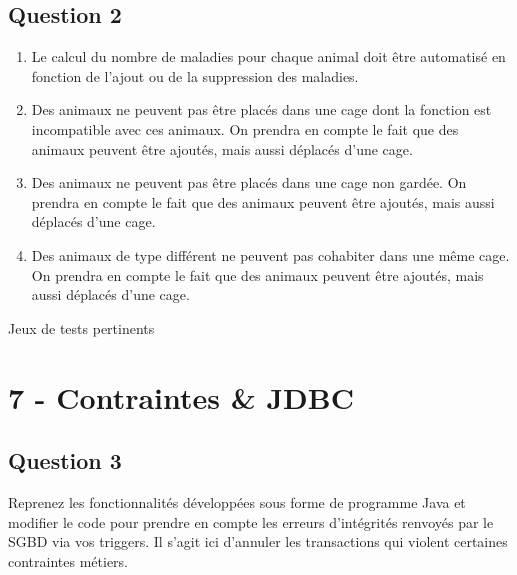 \documentclass{article}
\begin{document}
\subsection*{Question 2}
\begin{enumerate}[label=\arabic*)]
	\item Le calcul du nombre de maladies pour chaque animal doit être automatisé en fonction de l’ajout
ou de la suppression des maladies.
	\item Des animaux ne peuvent pas être placés dans une cage dont la fonction est incompatible avec
ces animaux. On prendra en compte le fait que des animaux peuvent être ajoutés, mais aussi
déplacés d’une cage.
	\item Des animaux ne peuvent pas être placés dans une cage non gardée. On prendra en compte le
fait que des animaux peuvent être ajoutés, mais aussi déplacés d’une cage.
	\item Des animaux de type différent ne peuvent pas cohabiter dans une même cage. On prendra en
compte le fait que des animaux peuvent être ajoutés, mais aussi déplacés d’une cage.
\end{enumerate}

Jeux de tests pertinents

\section*{7 - Contraintes \& JDBC}
\subsection*{Question 3}

Reprenez les fonctionnalités développées sous forme de programme Java et modifier le code pour prendre
en compte les erreurs d’intégrités renvoyés par le SGBD via vos triggers. Il s’agit ici d’annuler
les transactions qui violent certaines contraintes métiers.
\end{document}
